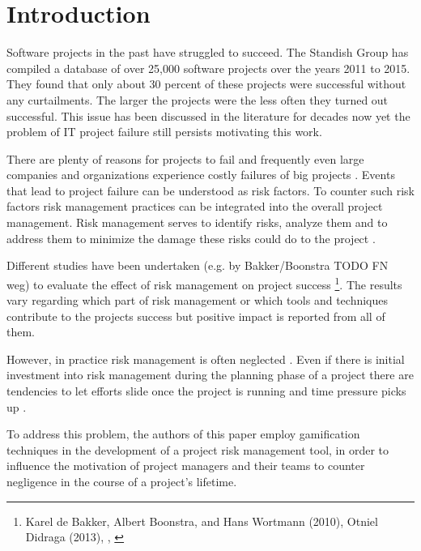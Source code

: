 \chapter{Introduction}
\label{ch:introduction}

Software projects in the past have struggled to succeed. The Standish Group \cite{thestandishgroupinternationalincChaosReport20152015} has compiled a database of over 25,000 software projects over the years 2011 to 2015. They found that only about 30 percent of these projects were successful without any curtailments. The larger the projects were the less often they turned out successful. This issue has been discussed in the literature for decades now yet the problem of IT project failure still persists motivating this work. \cite{thestandishgroupinternationalincChaosReport20152015}

There are plenty of reasons for projects to fail and frequently even large companies and organizations experience costly failures of big projects \cite{dwivediResearchInformationSystems2015}. Events that lead to project failure can be understood as risk factors. To counter such risk factors risk management practices can be integrated into the overall project management. Risk management serves to identify risks, analyze them and to address them to minimize the damage these risks could do to the project \cite{teschITProjectRisk2007}.

Different studies have been undertaken (e.g. by Bakker/Boonstra TODO FN weg) to evaluate the effect of risk management on project success \footnote{Karel de Bakker, Albert Boonstra, and Hans Wortmann (2010), Otniel Didraga (2013), \cite{kwakProjectRiskManagement2004}, \cite{peixotoProjectRiskManagement2014}}. The results vary regarding which part of risk management or which tools and techniques contribute to the projects success but positive impact is reported from all of them.

However, in practice risk management is often neglected \cite{kwakProjectRiskManagement2004}. Even if there is initial investment into risk management during the planning phase of a project there are tendencies to let efforts slide once the project is running and time pressure picks up \cite{peixotoProjectRiskManagement2014}.

To address this problem, the authors of this paper employ gamification techniques in the development of a project risk management tool, in order to influence the motivation of project managers and their teams to counter negligence in the course of a project’s lifetime.

